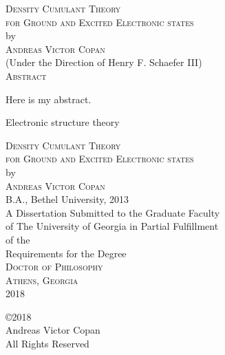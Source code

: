 \documentclass[12pt,notitlepage]{report}
\newcommand{\dissertationtitle}{%
    Density Cumulant Theory\\for Ground and Excited Electronic states}
\newcommand{\whoami}{Andreas Victor Copan}
\begin{document}
\newpage
\thispagestyle{empty}
\vspace*{18pt}
\begin{center}
\textsc{\large{\dissertationtitle}}\\[18pt]
by\\[18pt]
\textsc{\whoami}\\[12pt]
(Under the Direction of Henry F. Schaefer III)\\[12pt]
\textsc{Abstract}
\end{center}
Here is my abstract.
\thispagestyle{empty}

\begin{list}{\textsc{Index words:\hfill}}{\leftmargin 1.4in}
\item 
\begin{flushleft}\singlespacing
    Electronic structure theory
\end{flushleft}
\end{list}

\newpage
{}
\thispagestyle{empty}
\vspace*{18pt}
\begin{center}
\textsc{\large{\dissertationtitle}}\\[18pt]
by\\[18pt]
\textsc{\whoami}\\[12pt]
B.A., Bethel University, 2013\\
\vfill
A Dissertation Submitted to the Graduate Faculty \\
of The University of Georgia in Partial Fulfillment \\
of the \\
Requirements for the Degree \\[10pt]
\textsc{Doctor of Philosophy}\\[36pt]
\textsc{Athens, Georgia}\\[18pt]
2018
\end{center}

\newpage
\thispagestyle{empty}
\vspace*{5.5in}
\begin{center}
\copyright 2018 \\
\whoami \\
All Rights Reserved
\end{center}
\end{document}
